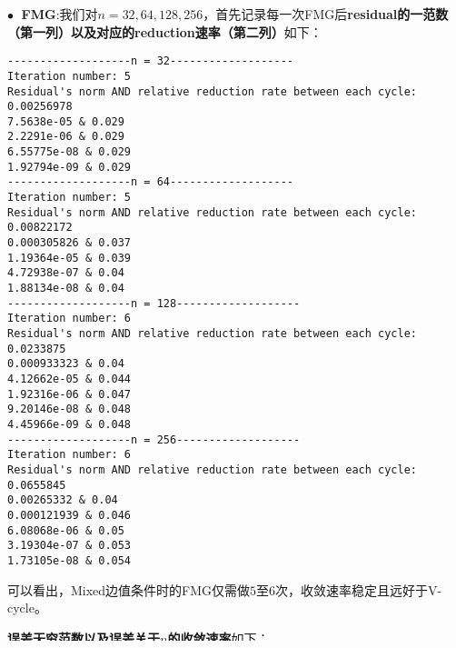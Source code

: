 \documentclass{ctexart}
\begin{document}
\begin{sloppypar}
$\bullet \;$ \textbf{FMG}:我们对$n=32,64,128,256$，首先记录每一次FMG后\textbf{residual的一范数（第一列）以及对应的reduction速率（第二列）}如下：
\begin{shaded}
\begin{verbatim}
-------------------n = 32-------------------
Iteration number: 5
Residual's norm AND relative reduction rate between each cycle: 
0.00256978
7.5638e-05 & 0.029
2.2291e-06 & 0.029
6.55775e-08 & 0.029
1.92794e-09 & 0.029
-------------------n = 64-------------------
Iteration number: 5
Residual's norm AND relative reduction rate between each cycle: 
0.00822172
0.000305826 & 0.037
1.19364e-05 & 0.039
4.72938e-07 & 0.04
1.88134e-08 & 0.04
-------------------n = 128-------------------
Iteration number: 6
Residual's norm AND relative reduction rate between each cycle: 
0.0233875
0.000933323 & 0.04
4.12662e-05 & 0.044
1.92316e-06 & 0.047
9.20146e-08 & 0.048
4.45966e-09 & 0.048
-------------------n = 256-------------------
Iteration number: 6
Residual's norm AND relative reduction rate between each cycle: 
0.0655845
0.00265332 & 0.04
0.000121939 & 0.046
6.08068e-06 & 0.05
3.19304e-07 & 0.053
1.73105e-08 & 0.054
\end{verbatim}
\end{shaded}
可以看出，Mixed边值条件时的FMG仅需做$5$至$6$次，收敛速率稳定且远好于V-cycle。

\textbf{误差无穷范数以及误差关于$n$的收敛速率}如下：
\begin{shaded}
\begin{verbatim}
------------------errornorm report-------------------
Errornorm of each n: 
0.00022433, 5.66526e-05, 1.42402e-05, 3.57187e-06 
Relative convergence rate(1og 2) between each n: 
1.98541, 1.99218, 1.99522
\end{verbatim} 
\end{shaded}
可以看出，FMG得到的误差无穷范数收敛阶稳定在$2$左右，从而验证了程序的正确性。


\end{sloppypar}
\end{document}
